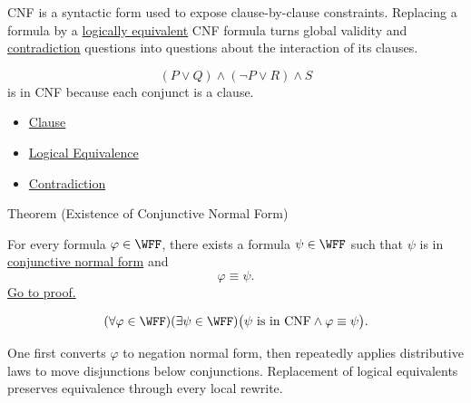 \begin{remark*}[Interpretation]
CNF is a syntactic form used to expose clause-by-clause constraints. Replacing
a formula by a
\hyperref[def:logical-equivalence-propositional-logic]{logically equivalent}
CNF formula turns global validity and
\hyperref[def:contradiction-propositional-logic]{contradiction} questions into
questions about the interaction of its clauses.
\end{remark*}

\begin{example*}[Examples]
\[
(P\lor Q)\land(\neg P\lor R)\land S
\]
is in CNF because each conjunct is a clause.
\end{example*}

\begin{dependencies}
\begin{itemize}
  \item \hyperref[def:clause-propositional-logic]{Clause}
  \item \hyperref[def:logical-equivalence-propositional-logic]{Logical Equivalence}
  \item \hyperref[def:contradiction-propositional-logic]{Contradiction}
\end{itemize}
\end{dependencies}

\begin{theorembox}{Theorem (Existence of Conjunctive Normal Form)}
\begin{theorem}
\label{thm:existence-conjunctive-normal-form-propositional-logic}
For every formula \(\varphi\in\WFF\), there exists a formula
\(\psi\in\WFF\) such that \(\psi\) is in
\hyperref[def:conjunctive-normal-form-propositional-logic]{conjunctive normal form}
and
\[
\varphi\equiv\psi.
\]
\noindent\hyperref[prf:existence-conjunctive-normal-form-propositional-logic]{Go to proof.}
\end{theorem}
\end{theorembox}

\begin{remark*}
\[
(\forall\varphi\in\WFF)(\exists\psi\in\WFF)
\bigl(\psi\text{ is in CNF}\land \varphi\equiv\psi\bigr).
\]
\end{remark*}

\begin{remark*}[Interpretation]
One first converts \(\varphi\) to negation normal form, then repeatedly applies
distributive laws to move disjunctions below conjunctions. Replacement of
logical equivalents preserves equivalence through every local rewrite.
\end{remark*}

